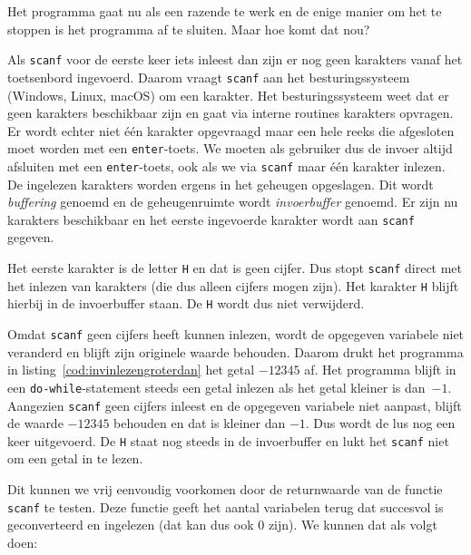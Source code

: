 Het programma gaat nu als een razende te werk en de enige manier om het te stoppen is het programma af te sluiten. Maar hoe komt dat nou?

Als \texttt{scanf} voor de eerste keer iets inleest dan zijn er nog geen karakters vanaf het toetsenbord ingevoerd. Daarom vraagt \texttt{scanf} aan het besturingssysteem (Windows, Linux, macOS) om een karakter. Het besturingssysteem weet dat er geen karakters beschikbaar zijn en gaat via interne routines karakters opvragen. Er wordt echter niet \'e\'en karakter opgevraagd maar een hele reeks die afgesloten moet worden met een \texttt{enter}-toets. We moeten als gebruiker dus de invoer altijd afsluiten met een \texttt{enter}-toets, ook als we via \texttt{scanf} maar \'e\'en karakter inlezen. De ingelezen karakters worden ergens in het geheugen opgeslagen. Dit wordt \textsl{buffering} genoemd en de geheugenruimte wordt \textsl{invoerbuffer} genoemd. Er zijn nu karakters beschikbaar en het eerste ingevoerde karakter wordt aan \texttt{scanf} gegeven.

Het eerste karakter is de letter \texttt{H} en dat is geen cijfer. Dus stopt \texttt{scanf} direct met het inlezen van karakters (die dus alleen cijfers mogen zijn). Het karakter \texttt{H} blijft hierbij in de invoerbuffer staan. De \texttt{H} wordt dus niet verwijderd.

Omdat \texttt{scanf} geen cijfers heeft kunnen inlezen, wordt de opgegeven variabele niet veranderd en blijft zijn originele waarde behouden. Daarom drukt het programma in listing~\ref{cod:invinlezengroterdan} het getal $-12345$ af. Het programma blijft in een \texttt{do-while}-statement steeds een getal inlezen als het getal kleiner is dan~$-1$. Aangezien \texttt{scanf} geen cijfers inleest en de opgegeven variabele niet aanpast, blijft de waarde $-12345$ behouden en dat is kleiner dan $-1$. Dus wordt de lus nog een keer uitgevoerd. De \texttt{H} staat nog steeds in de invoerbuffer en lukt het \texttt{scanf} niet om een getal in te lezen.

Dit kunnen we vrij eenvoudig voorkomen door de returnwaarde van de functie \texttt{scanf} te testen. Deze functie geeft het aantal variabelen terug dat succesvol is geconverteerd en ingelezen (dat kan dus ook 0 zijn). We kunnen dat als volgt doen:

